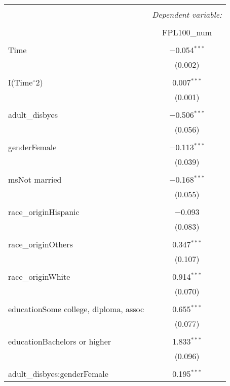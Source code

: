 \begin{table}[!htbp] \centering 
\tiny
  \caption{} 
  \label{} 
\begin{tabular}{@{\extracolsep{5pt}}lc} 
\\[-1.8ex]\hline 
\hline \\[-1.8ex] 
 & \multicolumn{1}{c}{\textit{Dependent variable:}} \\ 
\cline{2-2} 
\\[-1.8ex] & FPL100\_num \\ 
\hline \\[-1.8ex] 
 Time & $-$0.054$^{***}$ \\ 
  & (0.002) \\ 
  & \\ 
 I(Time$\hat{\mkern6mu}$2) & 0.007$^{***}$ \\ 
  & (0.001) \\ 
  & \\ 
 adult\_disbyes & $-$0.506$^{***}$ \\ 
  & (0.056) \\ 
  & \\ 
 genderFemale & $-$0.113$^{***}$ \\ 
  & (0.039) \\ 
  & \\ 
 msNot married & $-$0.168$^{***}$ \\ 
  & (0.055) \\ 
  & \\ 
 race\_originHispanic & $-$0.093 \\ 
  & (0.083) \\ 
  & \\ 
 race\_originOthers & 0.347$^{***}$ \\ 
  & (0.107) \\ 
  & \\ 
 race\_originWhite & 0.914$^{***}$ \\ 
  & (0.070) \\ 
  & \\ 
 educationSome college, diploma, assoc & 0.655$^{***}$ \\ 
  & (0.077) \\ 
  & \\ 
 educationBachelors or higher & 1.833$^{***}$ \\ 
  & (0.096) \\ 
  & \\ 
 adult\_disbyes:genderFemale & 0.195$^{***}$ \\ 

\end{tabular}
\end{table}
